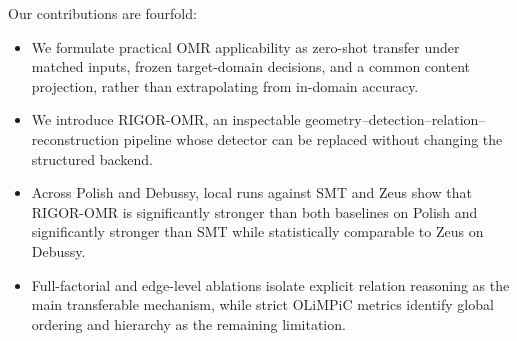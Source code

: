 Our contributions are fourfold:
\begin{itemize}
  \item We formulate practical OMR applicability as zero-shot transfer under matched inputs, frozen target-domain decisions, and a common content projection, rather than extrapolating from in-domain accuracy.
  \item We introduce RIGOR-OMR, an inspectable geometry--detection--relation--reconstruction pipeline whose detector can be replaced without changing the structured backend.
  \item Across Polish and Debussy, local runs against SMT and Zeus show that RIGOR-OMR is significantly stronger than both baselines on Polish and significantly stronger than SMT while statistically comparable to Zeus on Debussy.
  \item Full-factorial and edge-level ablations isolate explicit relation reasoning as the main transferable mechanism, while strict OLiMPiC metrics identify global ordering and hierarchy as the remaining limitation.
\end{itemize}
